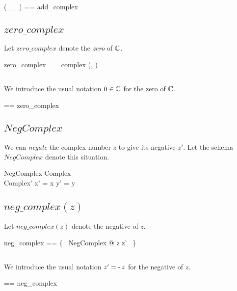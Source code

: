 \documentclass[11pt, oneside]{article}
\begin{document}
\begin{zed}
	(\_ \addC \_) == add\_complex
\end{zed}

\subsection{$zero\_complex$}

Let $zero\_complex$ denote the \textit{zero} of $\mathbb{C}$.

\begin{zed}
	zero\_complex == complex (\zeroR, \zeroR)
\end{zed}

\subsection{}

We introduce the usual notation $0 \in \mathbb{C}$ for the zero of $\mathbb{C}$.

\begin{zed}
	\zeroC == zero\_complex
\end{zed}

\subsection{$NegComplex$}

We can \textit{negate} the complex number $z$ to give its negative $z'$.
Let the schema $NegComplex$ denote this situation.

\begin{schema}{NegComplex}
	Complex \\
	Complex'
\where
	x' = \negR x
\also
	y' = \negR y
\end{schema}

\subsection{$neg\_complex(z)$}

Let $neg\_complex(z)$ denote the negative of $z$.

\begin{zed}
	neg\_complex == \{~ NegComplex @ z \mapsto z' ~\}
\end{zed}

\subsection{}

We introduce the usual notation $z' = \operatorname{-} z$ for the negative of $z$.
\begin{zed}
	\negC == neg\_complex
\end{zed}
\end{document}
